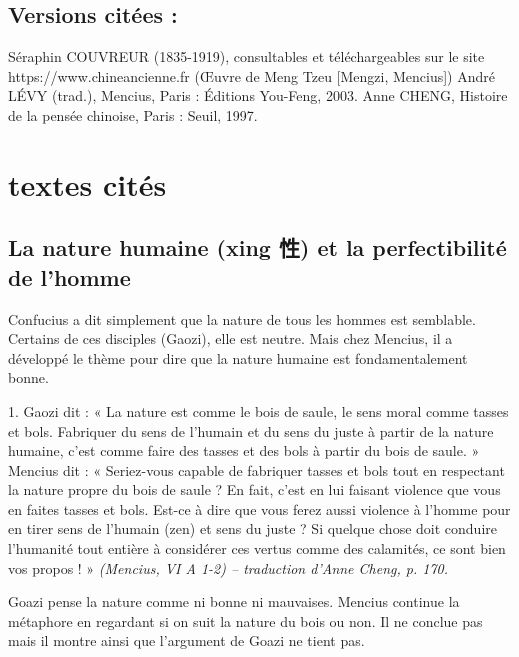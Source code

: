 \subsection{Versions citées :}

Séraphin	COUVREUR	(1835-1919),	consultables	et	téléchargeables	sur	le	site https://www.chineancienne.fr (Œuvre de Meng Tzeu [Mengzi, Mencius])
André LÉVY (trad.), Mencius, Paris : Éditions You-Feng, 2003. Anne CHENG, Histoire de la pensée chinoise, Paris : Seuil, 1997.


\section{textes cités}

\subsection{La nature humaine (xing 性) et la perfectibilité de l’homme}

Confucius a dit simplement que la nature de tous les hommes est semblable. Certains de ces disciples (Gaozi), elle est neutre. Mais chez Mencius, il a développé le thème pour dire que la nature humaine est fondamentalement bonne. 


\begin{singlequote}
    1.	Gaozi dit : « La nature est comme le bois de saule, le sens moral comme tasses et bols. Fabriquer du sens de l’humain et du sens du juste à partir de la nature humaine, c’est comme faire des tasses et des bols à partir du bois de saule. »
Mencius dit : « Seriez-vous capable de fabriquer tasses et bols tout en respectant la nature propre du bois de saule ? En fait, c’est en lui faisant violence que vous en faites tasses et bols. Est-ce à dire que vous ferez aussi violence à l’homme pour en tirer sens de l’humain (zen) et sens du juste ? Si quelque chose doit conduire l’humanité tout entière à considérer ces vertus comme des calamités, ce sont bien vos propos ! » 
 \textit{\small (Mencius, VI A 1-2)
-- traduction d’Anne Cheng, p. 170.}
\end{singlequote}

Goazi pense la nature comme ni bonne ni mauvaises. Mencius continue la métaphore en regardant si on suit la nature du bois ou non. Il ne conclue pas mais il montre ainsi que l'argument de Goazi ne tient pas.


